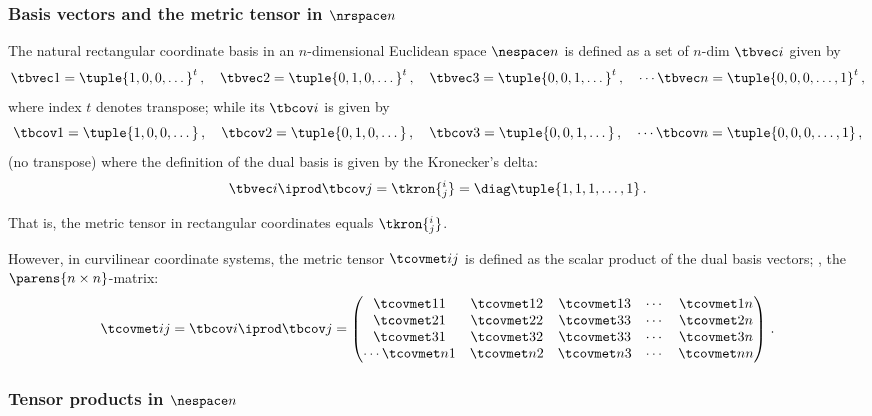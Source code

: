 \subsubsection{Basis vectors and the metric tensor in $\nrspace n$}

The natural rectangular coordinate basis in an $n$-dimensional Euclidean space $\nespace n$ is defined as a set of $n$-dim  $\tbvec i$ given by
%
\begin{equation*}
  \tbvec 1 = \tuple{1,0,0,\dotsc}^t \,,\quad
  \tbvec 2 = \tuple{0,1,0,\dotsc}^t \,,\quad
  \tbvec 3 = \tuple{0,0,1,\dotsc}^t \,,\quad
  \dotsb
  \tbvec n = \tuple{0,0,0,\dotsc,1}^t \,,
\end{equation*}
%
where index $t$ denotes transpose; while its  $\tbcov i$ is given by
%
\begin{equation*}
  \tbcov 1 = \tuple{1,0,0,\dotsc} \,,\quad
  \tbcov 2 = \tuple{0,1,0,\dotsc} \,,\quad
  \tbcov 3 = \tuple{0,0,1,\dotsc} \,,\quad
  \dotsb
  \tbcov n = \tuple{0,0,0,\dotsc,1} \,,
\end{equation*}
%
(no transpose) where the definition of the dual basis is given by the Kronecker's delta:
%
\begin{equation*}
  \tbvec i\iprod\tbcov j  = \tkron{^i_j} 
                            = \diag\tuple{1,1,1,\dotsc,1}\,.
\end{equation*}

That is, the metric tensor in rectangular coordinates equals $\tkron{^i_j}$. 

However, in curvilinear coordinate systems, the metric tensor $\tcovmet ij$ is defined as the scalar product of the dual basis vectors; \ie, the $\parens{n\times n}$-matrix:
%
\begin{equation*}
  \tcovmet ij = \tbcov i\iprod\tbcov j 
              = \begin{pmatrix}
                  \tcovmet 11 & \tcovmet 12 & \tcovmet 13 & \dotsb & \tcovmet 1n \\
                  \tcovmet 21 & \tcovmet 22 & \tcovmet 33 & \dotsb & \tcovmet 2n \\
                  \tcovmet 31 & \tcovmet 32 & \tcovmet 33 & \dotsb & \tcovmet 3n \\
                  \dotsb
                  \tcovmet n1 & \tcovmet n2 & \tcovmet n3 & \dotsb & \tcovmet nn
                \end{pmatrix}\,.
\end{equation*}


\subsubsection{Tensor products in $\nespace n$}

